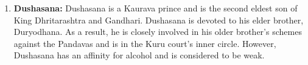 \documentclass[10pt, letterpaper]{article}
\begin{document}
\begin{enumerate}
\item
  
  \textbf{Dushasana:} Dushasana is a Kaurava prince and is the second
  eldest son of King Dhritarashtra and Gandhari. Dushasana is devoted to
  his elder brother, Duryodhana. As a result, he is closely involved in
  his older brother's schemes against the Pandavas and is in the Kuru
  court's inner circle. However, Dushasana has an affinity for alcohol
  and is considered to be weak.
  
\end{enumerate}
\end{document}
